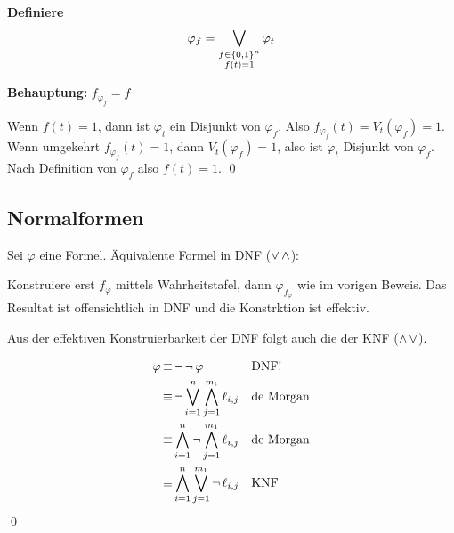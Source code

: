 \textbf{Definiere}
\begin{align}
  \varphi_f = \operatorname*{\bigvee}_{\substack{f\in\left\{0,1\right\}^n\\ f(t) = 1}} \varphi_t
\end{align}

\textbf{Behauptung:} $f_{\varphi_f} = f$

Wenn $f(t) = 1$, dann ist $\varphi_t$ ein Disjunkt von $\varphi_f$. Also
$f_{\varphi_f}(t) = V_t(\varphi_f)=1$. Wenn umgekehrt $f_{\varphi_f}(t) = 1$,
dann $V_t(\varphi_f)=1$, also ist $\varphi_t$ Disjunkt von $\varphi_f$. Nach
Definition von $\varphi_f$ also $f(t)=1$. \qed


\subsection{Normalformen}

Sei $\varphi$ eine Formel. Äquivalente Formel in DNF ($\operatorname{\vee}\operatorname{\wedge}$):

Konstruiere erst $f_\varphi$ mittels Wahrheitstafel, dann $\varphi_{f_\varphi}$
wie im vorigen Beweis. Das Resultat ist offensichtlich in DNF und die
Konstrktion ist effektiv.

Aus der effektiven Konstruierbarkeit der DNF folgt auch die der KNF ($\operatorname{\wedge}\operatorname{\vee}$).

\begin{align}
  \varphi &\operatorname{\equiv} \operatorname{\neg}\operatorname{\neg} \varphi                                 &&\text{DNF!}\\
          &\operatorname{\equiv} \operatorname{\neg}\operatorname*{\bigvee}_{i=1}^n \operatorname*{\bigwedge}_{j=1}^{m_i} \ell_{i,j}  &&\text{de Morgan}\\
          &\operatorname{\equiv} \operatorname*{\bigwedge}_{i=1}^n \operatorname{\neg}\operatorname*{\bigwedge}_{j=1}^{m_1} \ell_{i,j} &&\text{de Morgan}\\
          &\operatorname{\equiv} \operatorname*{\bigwedge}_{i=1}^n \operatorname*{\bigvee}_{j=1}^{m_1} \operatorname{\neg}\ell_{i,j}  &&\text{KNF}
\end{align}
\qed

